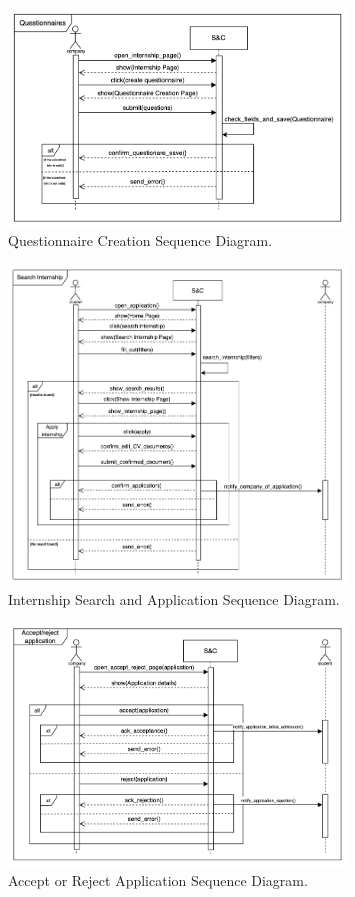 \begin{figure}[H]
\centering
\includegraphics[width=0.8\textwidth]{Images/Questionnaire_Sequence_Diagram.png}
\caption{\label{fig:metamodel9}Questionnaire Creation Sequence Diagram.}
\end{figure}

\begin{figure}[H]
\centering
\includegraphics[width=0.8\textwidth]{Images/Internship_Search_Application_Sequence_Diagram.png}
\caption{\label{fig:metamodel9}Internship Search and Application Sequence Diagram.}
\end{figure}

\begin{figure}[H]
\centering
\includegraphics[width=0.8\textwidth]{Images/Accept_Reject_Application_Sequence_Diagram.png}
\caption{\label{fig:metamodel9}Accept or Reject Application Sequence Diagram.}
\end{figure}

